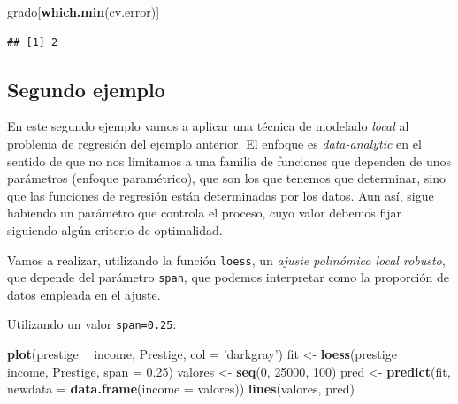 \documentclass[]{book}
\newenvironment{Shaded}{\begin{snugshade}}{\end{snugshade}}
\newcommand{\DataTypeTok}[1]{\textcolor[rgb]{0.13,0.29,0.53}{#1}}
\newcommand{\DecValTok}[1]{\textcolor[rgb]{0.00,0.00,0.81}{#1}}
\newcommand{\FloatTok}[1]{\textcolor[rgb]{0.00,0.00,0.81}{#1}}
\newcommand{\KeywordTok}[1]{\textcolor[rgb]{0.13,0.29,0.53}{\textbf{#1}}}
\newcommand{\NormalTok}[1]{#1}
\newcommand{\OperatorTok}[1]{\textcolor[rgb]{0.81,0.36,0.00}{\textbf{#1}}}
\newcommand{\StringTok}[1]{\textcolor[rgb]{0.31,0.60,0.02}{#1}}
\begin{document}
\begin{Shaded}
\begin{Highlighting}[]
\NormalTok{grado[}\KeywordTok{which.min}\NormalTok{(cv.error)]}
\end{Highlighting}
\end{Shaded}

\begin{verbatim}
## [1] 2
\end{verbatim}

\hypertarget{segundo-ejemplo}{%
\subsection{Segundo ejemplo}\label{segundo-ejemplo}}

En este segundo ejemplo vamos a aplicar una técnica de modelado \emph{local} al problema de
regresión del ejemplo anterior.
El enfoque es \emph{data-analytic} en el sentido de que no nos limitamos a una
familia de funciones que dependen de unos parámetros (enfoque paramétrico),
que son los que tenemos que determinar, sino que las funciones de
regresión están determinadas por los datos. Aun así, sigue habiendo un
parámetro que controla el proceso, cuyo valor debemos fijar siguiendo
algún criterio de optimalidad.

Vamos a realizar, utilizando la función \texttt{loess}, un \emph{ajuste polinómico local
robusto}, que depende del parámetro \texttt{span}, que podemos interpretar como la
proporción de datos empleada en el ajuste.

Utilizando un valor \texttt{span=0.25}:

\begin{Shaded}
\begin{Highlighting}[]
\KeywordTok{plot}\NormalTok{(prestige }\OperatorTok{~}\StringTok{ }\NormalTok{income, Prestige, }\DataTypeTok{col =} \StringTok{'darkgray'}\NormalTok{)}
\NormalTok{fit <-}\StringTok{ }\KeywordTok{loess}\NormalTok{(prestige }\OperatorTok{~}\StringTok{ }\NormalTok{income, Prestige, }\DataTypeTok{span =} \FloatTok{0.25}\NormalTok{)}
\NormalTok{valores <-}\StringTok{ }\KeywordTok{seq}\NormalTok{(}\DecValTok{0}\NormalTok{, }\DecValTok{25000}\NormalTok{, }\DecValTok{100}\NormalTok{)}
\NormalTok{pred <-}\StringTok{ }\KeywordTok{predict}\NormalTok{(fit, }\DataTypeTok{newdata =} \KeywordTok{data.frame}\NormalTok{(}\DataTypeTok{income =}\NormalTok{ valores))}
\KeywordTok{lines}\NormalTok{(valores, pred)}
\end{Highlighting}
\end{Shaded}
\end{document}
